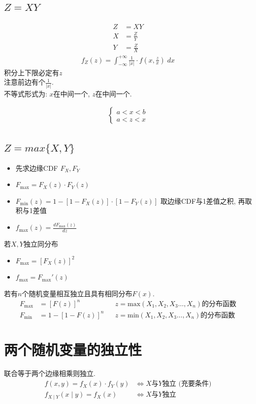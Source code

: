 \documentclass[a4paper]{report}
\begin{document}
\subsection{$Z=XY$}
\begin{align*}
  Z&=XY\\
  X&=\frac{Z}{Y}\\
  Y&=\frac{Z}{X}
\end{align*}
\begin{align*}
  f_Z(z)=\int_{-\infty}^{+\infty} \frac{1}{|x|}\cdot f(x,\frac{z}{x})\;dx
\end{align*}
积分上下限必定有$z$\\
注意前边有个$\frac{1}{|x|}$. \\
不等式形式为: $x$在中间一个, $z$在中间一个. 

\begin{align*}
  \begin{cases}
    a<x<b\\
    a<z<x
  \end{cases}
\end{align*}
\subsection{$Z=max \{X,Y\}$}
\begin{itemize}
  \item 先求边缘CDF $F_X,F_Y$
  \item $F_{\text{max}}=F_X(z)\cdot F_Y(z)$
  \item $F_{\text{min}}(z)=1-[1-F_X(z)]\cdot[1-F_Y(z)]$  取边缘CDF与1差值之积, 再取积与1差值
  \item $f_\text{max}(z)=\frac{d F_{\text{max}}(z) }{d z}$
\end{itemize}
若$X,Y$独立同分布
\begin{itemize}
  \item $F_{\text{max}}=[F_X(z)]^2$
  \item $f_{\text{max}}=F_{\text{max}}'(z)$
\end{itemize}
若有$n$个随机变量相互独立且具有相同分布$F(x)$. 
\begin{align*}
  F_{\text{max}}&=[F(z)]^n &&z=\text{max}(X_1,X_2,X_3\dots ,X_n)\text{的分布函数}\\
  F_{\text{min}}&=1-[1-F(z)]^n &&z=\text{min}(X_1,X_2,X_3\dots ,X_n)\text{的分布函数}
\end{align*}
\section{两个随机变量的独立性}
联合等于两个边缘相乘则独立. 
\begin{align*}
  f(x,y)=f_X(x)\cdot f_Y(y) &\Longleftrightarrow \text{$X$与$Y$独立 (充要条件)}\\
  f_{X\mid Y}(x\mid y)=f_X(x)&\Longleftrightarrow \text{$X$与$Y$独立}
\end{align*}
\end{document}

